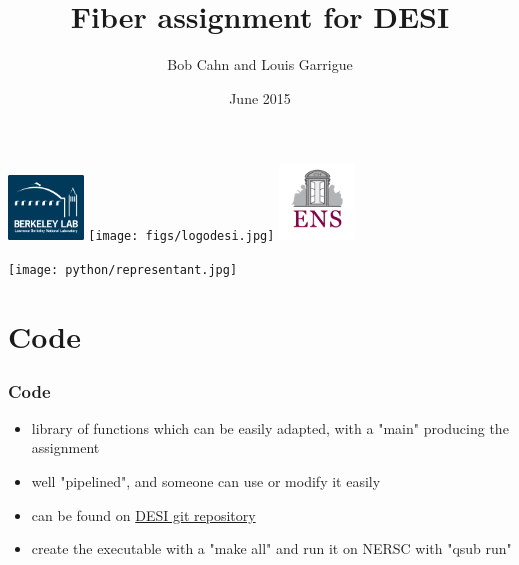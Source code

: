 \documentclass{beamer}
\title{Fiber assignment for DESI}
\author{Bob Cahn and Louis Garrigue}
\date{June 2015}
\begin{document}
  \begin{frame}
\maketitle
\begin{center}
  \includegraphics[width = 20mm]{figs/logolbnl.png} \hfill
  \texttt{[image: figs/logodesi.jpg]} \hfill
  \includegraphics[width = 20mm]{figs/logoens.png} 
\end{center}
  \end{frame}

  \begin{frame}
\begin{center}
  \texttt{[image: python/representant.jpg]}
\end{center}
  \end{frame}
\begin{frame}
  \tableofcontents
\end{frame}      
\section{Code}

\begin{frame}\frametitle{Code}
	\begin{itemize}
		\item library of functions which can be easily adapted, with a "main" producing the assignment
		\item well "pipelined", and someone can use or modify it easily
		\item can be found on \href{https://github.com/desihub/fiberassign}{DESI git repository}
		\item create the executable with a "make all" and run it on NERSC with "qsub run"
	\end{itemize}
\end{frame}
\end{document}
